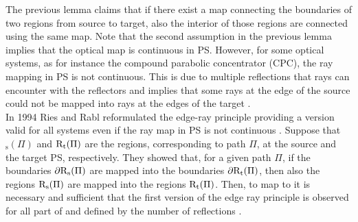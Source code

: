 The previous lemma claims that if there exist a map connecting the boundaries of two regions from source to target, also the interior of those regions are connected using the same map. Note that the second assumption in the previous lemma implies that the optical map is continuous in PS.
However, for some optical systems, as for instance the compound parabolic concentrator (CPC), the ray mapping in PS is not continuous. This is due to multiple reflections that rays can encounter with the reflectors and implies that some rays at the edge of the source could not be mapped into rays at the edges of the target \cite{davies1994edge}. \\ \indent 
In 1994 Ries and Rabl reformulated the edge-ray principle providing a version valid for all systems even if the ray map in PS is not continuous \cite{Ries:2}. 
Suppose that $_\textrm{s}(\Pi)$ and $\mbox{$\textup{R}$}_\textrm{t}(\Pi)$ are the regions, corresponding to path $\Pi$, at the source and the target PS, respectively. 
They showed that, for a given path $\Pi$, if the boundaries
$\partial\mbox{$\textup{R}$}_\textrm{s}(\Pi)$ are mapped into the boundaries $\partial\mbox{$\textup{R}$}_\textrm{t}(\Pi)$, then also the regions $\mbox{$\textup{R}$}_\textrm{s}(\Pi)$ are mapped into the regions $\mbox{$\textup{R}$}_\textrm{t}(\Pi)$.
Then, to map  to  it is necessary and sufficient that the first version of the edge ray principle is observed for all part of  and  defined by the number of reflections \cite{Ries:2}. 
